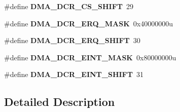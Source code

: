 \begin{DoxyCompactItemize}
\item 
\mbox{\label{group___d_m_a___register___masks_gaa453b5d53f87d5534ca546c4c6bef60f}} 
\#define {\bfseries D\+M\+A\+\_\+\+D\+C\+R\+\_\+\+C\+S\+\_\+\+S\+H\+I\+FT}~29
\item 
\mbox{\label{group___d_m_a___register___masks_gaf7a7b51a343f7ce8a595f528aae583be}} 
\#define {\bfseries D\+M\+A\+\_\+\+D\+C\+R\+\_\+\+E\+R\+Q\+\_\+\+M\+A\+SK}~0x40000000u
\item 
\mbox{\label{group___d_m_a___register___masks_gafc3838d15550b818d421a160ea57a247}} 
\#define {\bfseries D\+M\+A\+\_\+\+D\+C\+R\+\_\+\+E\+R\+Q\+\_\+\+S\+H\+I\+FT}~30
\item 
\mbox{\label{group___d_m_a___register___masks_gac5427564104425fdb45a492386cf05e7}} 
\#define {\bfseries D\+M\+A\+\_\+\+D\+C\+R\+\_\+\+E\+I\+N\+T\+\_\+\+M\+A\+SK}~0x80000000u
\item 
\mbox{\label{group___d_m_a___register___masks_gaee74e1c480eec935c3864d892445db29}} 
\#define {\bfseries D\+M\+A\+\_\+\+D\+C\+R\+\_\+\+E\+I\+N\+T\+\_\+\+S\+H\+I\+FT}~31
\end{DoxyCompactItemize}


\subsection{Detailed Description}
